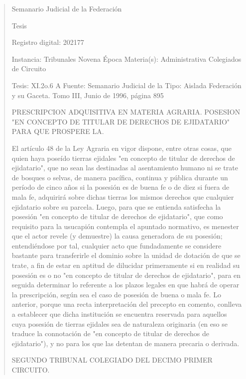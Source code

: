 \documentclass[11pt,a4paper]{article}
\begin{document}
\begin{quote}
                                                   Semanario Judicial de la Federación

                                                  Tesis

 Registro digital: 202177

 Instancia: Tribunales            Novena Época                          Materia(s): Administrativa
 Colegiados de Circuito

 Tesis: XI.2o.6 A                 Fuente: Semanario Judicial de la    Tipo: Aislada
                                  Federación y su Gaceta.
                                  Tomo III, Junio de 1996, página 895


PRESCRIPCION ADQUISITIVA EN MATERIA AGRARIA. POSESION "EN CONCEPTO DE
TITULAR DE DERECHOS DE EJIDATARIO" PARA QUE PROSPERE LA.


El artículo 48 de la Ley Agraria en vigor dispone, entre otras cosas, que quien haya poseído tierras
ejidales "en concepto de titular de derechos de ejidatario", que no sean las destinadas al
asentamiento humano ni se trate de bosques o selvas, de manera pacífica, continua y pública
durante un período de cinco años si la posesión es de buena fe o de diez si fuera de mala fe,
adquirirá sobre dichas tierras los mismos derechos que cualquier ejidatario sobre su parcela. Luego,
para que se entienda satisfecha la posesión "en concepto de titular de derechos de ejidatario", que
como requisito para la usucapión contempla el apuntado normativo, es menester que el actor revele
(y demuestre) la causa generadora de su posesión; entendiéndose por tal, cualquier acto que
fundadamente se considere bastante para transferirle el dominio sobre la unidad de dotación de que
se trate, a fin de estar en aptitud de dilucidar primeramente si en realidad su posesión es o no "en
concepto de titular de derechos de ejidatario", para en seguida determinar lo referente a los plazos
legales en que habrá de operar la prescripción, según sea el caso de posesión de buena o mala fe.
Lo anterior, porque una recta interpretación del precepto en comento, conlleva a establecer que
dicha institución se encuentra reservada para aquellos cuya posesión de tierras ejidales sea de
naturaleza originaria (en eso se traduce la connotación de "en concepto de titular de derechos de
ejidatario"), y no para los que las detentan de manera precaria o derivada.

SEGUNDO TRIBUNAL COLEGIADO DEL DECIMO PRIMER CIRCUITO.



\end{quote}
\end{document}
